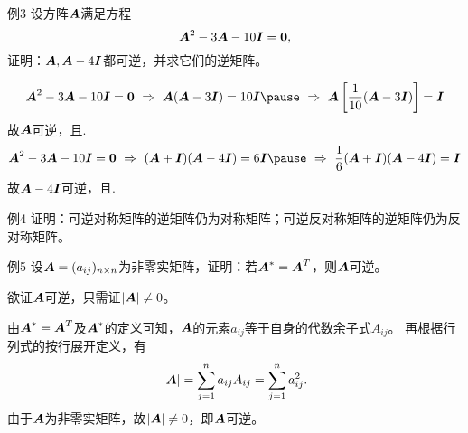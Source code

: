 \begin{frame}
  \begin{footnotesize}
    \begin{exampleblock}{例3}
      设方阵$\boldsymbol{A}$满足方程
      $$
      \boldsymbol{A}^2 - 3\boldsymbol{A} - 10 \boldsymbol{I} = \boldsymbol{0},
      $$
      证明：$\boldsymbol{A}, \boldsymbol{A}-4\boldsymbol{I}$都可逆，并求它们的逆矩阵。      
    \end{exampleblock}
    \pause
    \proofname
    $$
    \A^2-3\A-10\II=\zero ~\Rightarrow~ \A(\A-3\II) = 10\II \pause
    ~\Rightarrow~ \A\left[\frac1{10}(\A-3\II)\right] = \II
    $$ \pause 
    故$\boldsymbol{A}$可逆，且.
    \pause
    $$
    \A^2-3\A-10\II=\zero ~\Rightarrow~ (\A+\II)(\A-4\II) = 6\II \pause
    ~\Rightarrow~ \frac1{6}(\A+\II)(\A-4\II) = \II
    $$ \pause    
    故$\boldsymbol{A}-4\boldsymbol{I}$可逆，且.
  \end{footnotesize}
\end{frame}


\begin{frame}
  \begin{footnotesize}
    \begin{exampleblock}{例4}
      证明：可逆对称矩阵的逆矩阵仍为对称矩阵；可逆反对称矩阵的逆矩阵仍为反对称矩阵。
    \end{exampleblock}
  \end{footnotesize}
\end{frame}


\begin{frame}
  \begin{footnotesize}
    \begin{exampleblock}{例5}
      设$\boldsymbol{A}=(a_{ij})_{n\times n}$为非零实矩阵，证明：若$\boldsymbol{A}^*=\boldsymbol{A}^T$，则$\boldsymbol{A}$可逆。
    \end{exampleblock}
    \proofname
    欲证$\boldsymbol{A}$可逆，只需证$|\boldsymbol{A}|\ne 0$。
    \vspace{0.2cm}
    \pause
    
    由$\boldsymbol{A}^* = \boldsymbol{A}^T$及$\boldsymbol{A}^*$的定义可知，$\boldsymbol{A}$的元素$a_{ij}$等于自身的代数余子式$A_{ij}$。
    \pause
    再根据行列式的按行展开定义，有
    $$
    |\boldsymbol{A}| = \sum_{j=1}^n a_{ij} A_{ij} = \sum_{j=1}^n a_{ij}^2.
    $$
    \pause 
    由于$\boldsymbol{A}$为非零实矩阵，故$|\boldsymbol{A}|\ne 0$，即$\boldsymbol{A}$可逆。
  \end{footnotesize}
\end{frame}


